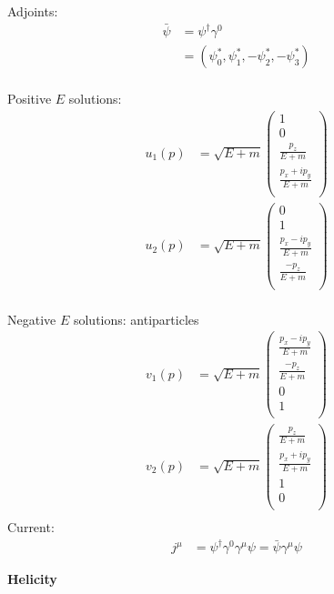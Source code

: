 \documentclass[10pt,letterpaper]{article}
\newcommand{\0}{\mathcal{O}}
\begin{document}
\begin{multicols}{3}
Adjoints:
\begin{align*}
    \bar{\psi} &= \psi^\dagger \gamma^0 \\
    &= (\psi_0^*, \psi_1^*, -\psi_2^*, -\psi_3^*) \\
\end{align*}

Positive $E$ solutions:
\begin{align*}
    u_1(p) &= \sqrt{E+m}\begin{pmatrix}
        1 \\
        0 \\
        \frac{p_z}{E+m}\\
        \frac{p_x + ip_y}{E+m} \\
    \end{pmatrix}\\
    u_2(p) &= \sqrt{E+m}\begin{pmatrix}
        0 \\
        1 \\
        \frac{p_x - ip_y}{E+m} \\
        \frac{-p_z}{E+m}\\
    \end{pmatrix}\\
\end{align*}

Negative $E$ solutions: antiparticles
\begin{align*}
    v_1(p) &= \sqrt{E+m}\begin{pmatrix}
        \frac{p_x - ip_y}{E+m} \\
        \frac{-p_z}{E+m}\\
        0 \\
        1 \\
    \end{pmatrix}\\
    v_2(p) &= \sqrt{E+m}\begin{pmatrix}
        \frac{p_z}{E+m}\\
        \frac{p_x + ip_y}{E+m} \\
        1 \\
        0 \\
    \end{pmatrix}\\
\end{align*}
Current:
\begin{align*}
    j^\mu &= \psi^\dagger\gamma^0\gamma^\mu\psi = \bar{\psi}\gamma^\mu\psi
\end{align*}

\textbf{Helicity}


\end{multicols}
\end{document}
